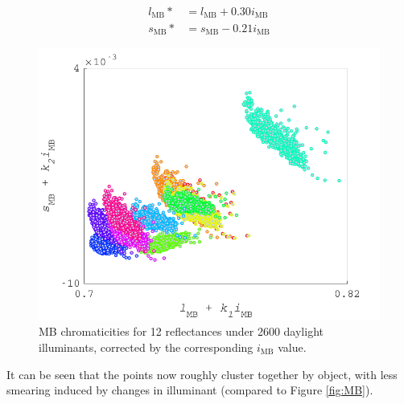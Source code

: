 \begin{subequations} \label{eq:correction}
\begin{align}
l_{\text{MB}}* &= l_{\text{MB}} + 0.30i_{\text{MB}}\\ %
s_{\text{MB}}* &= s_{\text{MB}} - 0.21i_{\text{MB}}
\end{align}
\end{subequations}

\begin{figure}[htbp]
    \includegraphics[max width=\textwidth]{figs/comp/melcomp_1/correctedChromaticities.pdf}
    \caption{\gls{MB} chromaticities for 12 reflectances under 2600 daylight illuminants, corrected by the corresponding $i_{\text{MB}}$ value.}
    \label{fig:corrected}
\end{figure} 

It can be seen that the points now roughly cluster together by object, with less smearing induced by changes in illuminant (compared to Figure \ref{fig:MB}).

